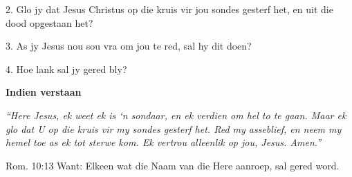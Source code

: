   2. Glo jy dat Jesus Christus op die kruis vir jou sondes gesterf het, en uit die dood opgestaan het?

  3. As jy Jesus nou sou vra om jou te red, sal hy dit doen?

  4. Hoe lank sal jy gered bly?


\textbf{Indien verstaan}

{\em “Here Jesus, ek weet ek is ‘n sondaar, en ek verdien om hel to te gaan.  Maar ek glo dat U op die kruis vir my sondes gesterf het.  Red my asseblief, en neem my hemel toe as ek tot sterwe kom.  Ek vertrou alleenlik op jou, Jesus.  Amen.” }

Rom. 10:13 Want: Elkeen wat die Naam van die Here aanroep, sal gered word.


